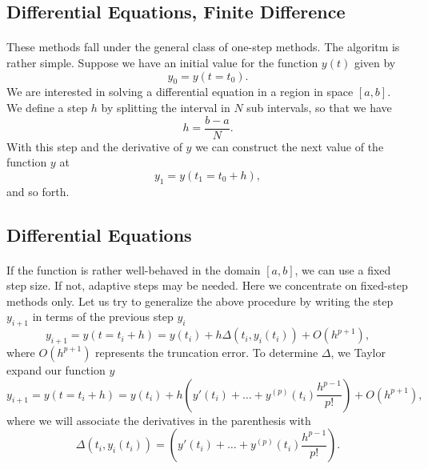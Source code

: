 \documentclass[%
oneside,                 %
final,                   %
10pt]{article}
\begin{document}
\subsection*{Differential Equations, Finite Difference}

\paragraph{}
These methods fall under the general class of one-step methods.
The algoritm is rather simple. 
Suppose we have an initial value for the function $y(t)$ given by
\begin{equation}
  y_0=y(t=t_0).
\end{equation}
We are interested in solving a differential equation in a region
in space $[a,b]$. We define a step $h$ by splitting the interval
in $N$ sub intervals, so that we have
\begin{equation}
  h=\frac{b-a}{N}.
\end{equation}
With this step and the derivative of $y$ we can construct the
next value of the function $y$ at
\begin{equation}
   y_1=y(t_1=t_0+h),
\end{equation}
and so forth.




\subsection*{Differential Equations}

\paragraph{}
If the function is rather well-behaved in the domain
$[a,b]$, we can use a fixed step size. If not, adaptive steps 
may be needed. Here we concentrate on fixed-step
methods only. 
Let us try to generalize the above procedure by writing the 
step $y_{i+1}$ in terms of the previous step $y_i$
\begin{equation}
  y_{i+1}=y(t=t_i+h)=y(t_i) + h\Delta(t_i,y_i(t_i)) + O(h^{p+1}),
\end{equation}
where $O(h^{p+1})$ represents the truncation error. To determine 
$\Delta$, we Taylor expand our function $y$
\begin{equation}
     y_{i+1}=y(t=t_i+h)=y(t_i) + h(y'(t_i)+\dots +y^{(p)}(t_i)\frac{h^{p-1}}{p!}) + O(h^{p+1}), \label{eq:taylor}
\end{equation}
where we will associate the derivatives in the parenthesis with
\begin{equation}
\Delta(t_i,y_i(t_i))=(y'(t_i)+\dots +y^{(p)}(t_i)\frac{h^{p-1}}{p!}). \label{eq:delta}
\end{equation}
\end{document}
